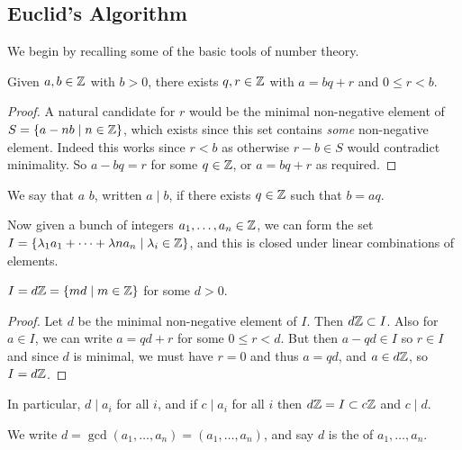 \documentclass[a4paper]{scrartcl}
\begin{document}
\subsection{Euclid's Algorithm}

We begin by recalling some of the basic tools of number theory.

\begin{theorem}
  Given $a, b \in \mathbb{Z}$ with $b > 0$, there exists $q, r \in \mathbb{Z}$ with $a = bq + r$ and $0 \leq r < b$.
\end{theorem}
\begin{proof}
A natural candidate for $r$ would be the minimal non-negative element of $S = \{a - nb \mid n \in \mathbb{Z}\}$, which exists since this set contains \emph{some} non-negative element. Indeed this works since $r < b$ as otherwise $r - b \in S$ would contradict minimality. So $a - bq = r$ for some $q \in \mathbb{Z}$, or $a = bq + r$ as required.
\end{proof}


\begin{definition}[Divides]
  We say that $a$  $b$, written $a \mid b$, if there exists $q \in \mathbb{Z}$ such that $b = aq$.
\end{definition}

Now given a bunch of integers $a_1, \dots, a_n \in \mathbb{Z}$, we can form the set $I = \{\lambda_1 a_1 + \cdots + \lambda n a_n \mid \lambda_i \in \mathbb{Z}\}$, and this is closed under linear combinations of elements. 

\begin{lemma}
  $I = d\mathbb{Z} = \{m d \mid m \in \mathbb{Z}\}$ for some $d > 0$.
\end{lemma}
\begin{proof}
  Let $d$ be the minimal non-negative element of $I$. Then $d \mathbb{Z} \subset I$. Also for $a \in I$, we can write $a = qd + r$ for some $0 \leq r < d$. But then $a - qd \in I$ so $r \in I$ and since $d$ is minimal, we must have $r = 0$ and thus $a = qd$, and $a \in d \mathbb{Z}$, so $I = d\mathbb{Z}$.
\end{proof}

In particular, $d \mid a_i$ for all $i$, and if $c \mid a_i$ for all $i$ then $d\mathbb{Z} = I \subset c\mathbb{Z}$ and $c \mid d$.

\begin{definition}
  We write $d = \gcd(a_1, \dots, a_n) = (a_1, \dots, a_n)$, and say $d$ is the  of $a_1, \dots, a_n$.
\end{definition}
\end{document}
